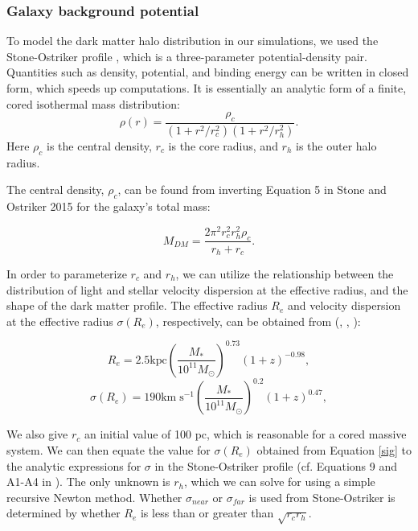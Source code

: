 \documentclass[fleqn,usenatbib,useAMS]{mnras}
\begin{document}
\subsubsection{Galaxy background potential} \label{Galaxy background potential}
To model the dark matter halo distribution in our simulations, we used the Stone-Ostriker profile \citep{2015ApJ...806L..28S}, which is a three-parameter potential-density pair.  Quantities such as density, potential, and binding energy can be written in closed form, which speeds up computations.  It is essentially an analytic form of a finite, cored isothermal mass distribution:
\begin{equation} \label{jerry}
\rho(r) = \frac{\rho_c}{(1+r^2/r_{c}^2)(1+r^2/r_{h}^2)}.
\end{equation}
Here $\rho_c$ is the central density, $r_c$ is the core radius, and $r_h$ is the outer halo radius.

The central density, $\rho_c$, can be found from inverting Equation 5 in Stone and Ostriker 2015 for the galaxy's total mass:

\begin{equation} \label{rhoc}
M_{DM} = \frac{2\pi^2r_{c}^2r_{h}^2\rho_c}{r_h+r_c}.
\end{equation}

In order to parameterize $r_c$ and $r_h$, we can utilize the relationship between the distribution of light and stellar velocity dispersion at the effective radius, and the shape of the dark matter profile.  The effective radius $R_{e}$ and velocity dispersion at the effective radius $\sigma(R_e)$, respectively, can be obtained from (\citet{2009ApJ...706L..86N}, \citet{2010ApJ...725.2312O}, \citet{2014ApJ...789..156M}):

\begin{equation} \label{re}
R_{e} = 2.5 \mathrm{kpc}\left(\frac{M_*}{10^{11}M_{\odot}}\right)^{0.73}(1+z)^{-0.98},
\end{equation}
\begin{equation} \label{sig}
\sigma(R_{e}) = 190\mathrm{km}\;\mathrm{s}^{-1}\left(\frac{M_{*}}{10^{11}M_{\odot}}\right)^{0.2}(1+z)^{0.47},
\end{equation}

We also give $r_c$ an initial value of 100 pc, which is reasonable for a cored massive system.  We can then equate the value for $\sigma({R_e})$ obtained from Equation \ref{sig} to the analytic expressions for $\sigma$ in the Stone-Ostriker profile (cf. Equations 9 and A1-A4 in \cite{2015ApJ...806L..28S}).  The only unknown is $r_h$, which we can solve for using a simple recursive Newton method.  Whether $\sigma_{near}$ or $\sigma_{far}$ is used from Stone-Ostriker is determined by whether $R_e$ is less than or greater than $\sqrt{r_c r_h}$.
\end{document}
